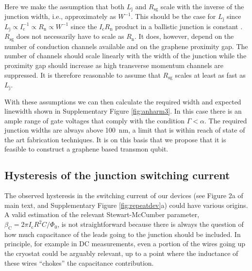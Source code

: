 Here we make the assumption that both $L_\text{j}$ and $R_\text{sg}$ scale with the inverse of the junction width, i.e., approximately as $W^{-1}$.
This should be the case for $L_\text{j}$ since $L_\text{j} \propto I_\text{c}^{-1} \propto R_\text{n} \propto W^{-1}$ since the $I_\text{c}R_\text{n}$ product in a ballistic junction is constant \cite{titovJosephsonEffectBallistic2006b}.
$R_\text{sg}$ does not necessarily have to scale as $R_\text{n}$.
It does, however, depend on the number of conduction channels available and on the graphene proximity gap.
The number of channels should scale linearly with the width of the junction while the proximity gap should increase as high transverse momentum channels are suppressed.
It is therefore reasonable to assume that $R_\text{sg}$ scales at least as fast as $L_\text{j}$.

With these assumptions we can then calculate the required width and expected linewidth shown in Supplementary Figure \ref{fig:anharm3}.
In this case there is an ample range of gate voltages that comply with the condition $\Gamma<\alpha$.
The required junction widths are always above \SI{100}{nm}, a limit that is within reach of state of the art fabrication techniques.
It is on this basis that we propose that it is feasible to construct a graphene based transmon qubit.




\subsection{Hysteresis of the junction switching current}\label{sec:hysteresis}
\noindent The observed hysteresis in the switching current of our devices (see Figure 2a of main text, and Supplementary Figure \ref{fig:repeatdev}a) could have various origins.
A valid estimation of the relevant Stewart-McCumber parameter\cite{tinkhamIntroductionSuperconductivity1996}, $\beta_\text{C}=2\pi I_\text{c}R^2C/\Phi_0$, is not straightforward because there is always the question of how much capacitance of the leads going to the junction should be included.
In principle, for example in DC measurements, even a portion of the wires going up the cryostat could be arguably relevant, up to a point where the inductance of these wires ``chokes'' the capacitance contribution.

